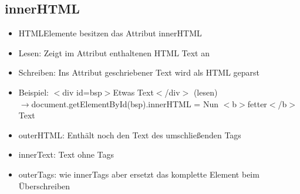 \documentclass{article} %
\begin{document}
	\subsection{innerHTML}
	\begin{itemize}
		\item HTMLElemente besitzen das Attribut innerHTML
		\item Lesen: Zeigt im Attribut enthaltenen HTML Text an
		\item Schreiben: Ins Attribut geschriebener Text wird als HTML geparst
		\item Beispiel: $<$div id=\grqq bsp\grqq$>$Etwas Text$<$/div$>$ (lesen)\\
		$\rightarrow$document.getElementById(\glqq bsp\grqq ).innerHTML = \glqq Nun $<$b$>$fetter$<$/b$>$ Text\grqq 
		\item outerHTML: Enthält noch den Text des umschließenden Tags
		\item innerText: Text ohne Tags
		\item outerTags: wie innerTags aber ersetzt das komplette Element beim Überschreiben
	\end{itemize}
\end{document}

